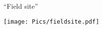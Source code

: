 \documentclass[aspectratio=169]{beamer}
\begin{document}
\begin{frame}{``Field site''}
\begin{center}
\texttt{[image: Pics/fieldsite.pdf]}
\end{center}

\end{frame}
\end{document}
